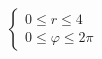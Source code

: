 \documentclass[preview]{standalone}
\begin{document}
\begin{align*}
\left\{ \begin{array}{l}0 \leq r \leq 4 \\0 \leq \varphi \leq 2\pi\end{array} \right.
\end{align*}
\end{document}

